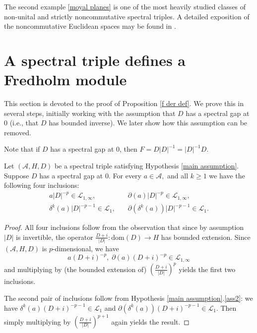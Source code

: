     The second example \eqref{moyal planes} is one of the most heavily studied classes of non-unital and strictly noncommutative spectral triples. A detailed exposition
    of the noncommutative Euclidean spaces may be found in \cite{gayral-moyal}.
    
\section{A spectral triple defines a Fredholm module}\label{fredholm section}

    This section is devoted to the proof of Proposition \ref{f der def}. We prove this in several steps, initially working with the assumption that $D$ has a spectral
    gap at $0$ (i.e., that $D$ has bounded inverse). We later show how this assumption can be removed. 
    
    Note that if $D$ has a spectral gap at $0$, then $F = D|D|^{-1} = |D|^{-1}D$.

    \begin{rem}\label{sp gap fact} 
        Let $(\mathcal{A},H,D)$ be a spectral triple satisfying Hypothesis \ref{main assumption}. Suppose $D$ has a spectral gap at $0.$ For every $a\in\mathcal{A},$ and all $k\geq 1$ we have
        the following four inclusions:
        \begin{align*}
            a|D|^{-p}\in \mathcal{L}_{1,\infty},&\quad \partial(a)|D|^{-p} \in \mathcal{L}_{1,\infty},\\
            \delta^k(a)|D|^{-p-1} \in \mathcal{L}_{1},&\quad \partial(\delta^k(a))|D|^{-p-1}\in \mathcal{L}_1.
        \end{align*}
    \end{rem}
    \begin{proof} 
        All four inclusions follow from the observation that since by assumption $|D|$ is invertible, the operator $\frac{D+i}{|D|}:\mathrm{dom}(D)\to H$ has bounded extension. 
        Since $(\mathcal{A},H,D)$ is $p$-dimensional, we have
        \begin{equation*}
            a(D+i)^{-p},\;\partial(a)(D+i)^{-p} \in \mathcal{L}_{1,\infty}
        \end{equation*}
        and multiplying by (the bounded extension of) $\left(\frac{D+i}{|D|}\right)^p$ yields the first two inclusions.
        
        The second pair of inclusions follow from Hypothesis \ref{main assumption}.\eqref{ass2}: we have $\delta^k(a)(D+i)^{-p-1} \in \mathcal{L}_1$ and $\partial(\delta^k(a))(D+i)^{-p-1} \in \mathcal{L}_1$.
        Then simply multiplying by $\left(\frac{D+i}{|D|}\right)^{p+1}$ again yields the result.
    \end{proof}

